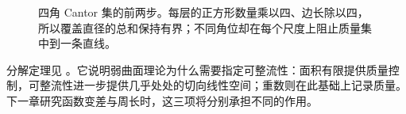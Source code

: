 \begin{figure}[htbp]
	\centering
	
	\caption{四角 Cantor 集的前两步。每层的正方形数量乘以四、边长除以四，所以覆盖直径的总和保持有界；不同角位却在每个尺度上阻止质量集中到一条直线。}
	\label{g3:fig:four-corner-cantor}
\end{figure}

分解定理见 \cite[第13节，定理13.1，第70页]{Simon1983}。它说明弱曲面理论为什么需要指定可整流性：面积有限提供质量控制，可整流性进一步提供几乎处处的切向线性空间；重数则在此基础上记录质量。下一章研究函数变差与周长时，这三项将分别承担不同的作用。
